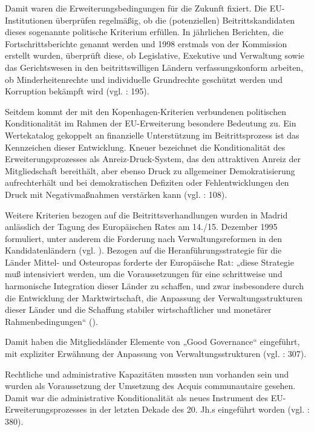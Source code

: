 Damit waren die Erweiterungsbedingungen für die Zukunft fixiert. Die EU-Institutionen überprüfen regelmäßig, ob die (potenziellen) Beitrittskandidaten dieses sogenannte politische Kriterium erfüllen. In jährlichen Berichten, die Fortschrittsberichte genannt werden und 1998 erstmals von der Kommission erstellt wurden, überprüft diese, ob Legislative, Exekutive und Verwaltung sowie das Gerichtswesen in den beitrittswilligen Ländern verfassungskonform arbeiten, ob Minderheitenrechte und individuelle Grundrechte geschützt werden und Korruption bekämpft wird (vgl. \cite{brusis09} : 195).
\par
Seitdem kommt der mit den Kopenhagen-Kriterien verbundenen politischen Konditionalität im Rahmen der EU-Erweiterung besondere Bedeutung zu. Ein Wertekatalog gekoppelt an finanzielle Unterstützung im Beitrittsprozess ist das Kennzeichen dieser Entwicklung. Kneuer bezeichnet die Konditionalität des Erweiterungsprozesses als Anreiz-Druck-System, das den attraktiven Anreiz der Mitgliedschaft bereithält, aber ebenso Druck zu allgemeiner Demokratisierung aufrechterhält und bei demokratischen Defiziten oder Fehlentwicklungen den Druck mit Negativmaßnahmen verstärken kann (vgl. \cite{kneuer07} : 108).\par
Weitere Kriterien bezogen auf die Beitrittsverhandlungen wurden in Madrid anlässlich der Tagung des Europäischen Rates am 14./15. Dezember 1995 formuliert, unter anderem die Forderung nach Verwaltungsreformen in den Kandidatenländern (vgl. \cite{dimit02}). Bezogen auf die Heranführungsstrategie für die Länder Mittel- und Osteuropas forderte der Europäische Rat:
„diese Strategie muß intensiviert werden, um die Voraussetzungen für eine schrittweise und harmonische Integration dieser Länder zu schaffen, und zwar insbesondere durch die Entwicklung der Marktwirtschaft, die Anpassung der Verwaltungsstrukturen dieser Länder und die Schaffung stabiler wirtschaftlicher und monetärer Rahmenbedingungen“ (\cite{eurrat}).\par
Damit haben die Mitgliedsländer Elemente von „Good Governance“ eingeführt, mit expliziter Erwähnung der Anpassung von Verwaltungsstrukturen (vgl. \cite{sabzei} : 307).\par
Rechtliche und administrative Kapazitäten mussten nun vorhanden sein und wurden als Voraussetzung der Umsetzung des Acquis communautaire gesehen. Damit war die administrative Konditionalität als neues Instrument des EU-Erweiterungsprozesses in der letzten Dekade des 20. Jh.s eingeführt worden (vgl. \cite{tomtul} : 380).\par
